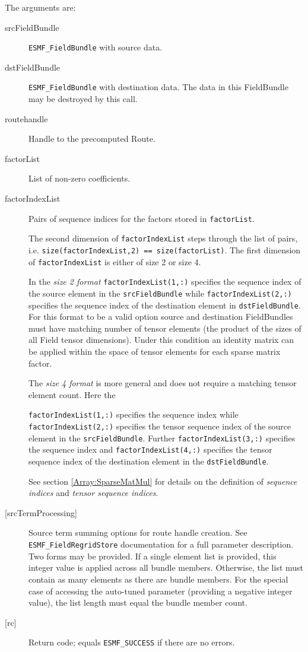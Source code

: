    The arguments are:
   \begin{description}
   \item [srcFieldBundle]
   {\tt ESMF\_FieldBundle} with source data.
   \item [dstFieldBundle]
   {\tt ESMF\_FieldBundle} with destination data. The data in this
   FieldBundle may be destroyed by this call.
   \item [routehandle]
   Handle to the precomputed Route.
   \item [factorList]
   List of non-zero coefficients.
   \item [factorIndexList]
   Pairs of sequence indices for the factors stored in {\tt factorList}.
  
   \begin{sloppypar}
   The second dimension of {\tt factorIndexList} steps through the list of
   pairs, i.e. {\tt size(factorIndexList,2) == size(factorList)}. The first
   dimension of {\tt factorIndexList} is either of size 2 or size 4.
   \end{sloppypar}
  
   In the {\em size 2 format} {\tt factorIndexList(1,:)} specifies the
   sequence index of the source element in the {\tt srcFieldBundle} while
   {\tt factorIndexList(2,:)} specifies the sequence index of the
   destination element in {\tt dstFieldBundle}. For this format to be a valid
   option source and destination FieldBundles must have matching number of
   tensor elements (the product of the sizes of all Field tensor dimensions).
   Under this condition an identity matrix can be applied within the space of
   tensor elements for each sparse matrix factor.
  
   The {\em size 4 format} is more general and does not require a matching
   tensor element count. Here the
  
   {\tt factorIndexList(1,:)} specifies the
   sequence index while {\tt factorIndexList(2,:)} specifies the tensor
   sequence index of the source element in the {\tt srcFieldBundle}. Further
   {\tt factorIndexList(3,:)} specifies the sequence index and
   {\tt factorIndexList(4,:)} specifies the tensor sequence index of the
   destination element in the {\tt dstFieldBundle}.
  
   See section \ref{Array:SparseMatMul} for details on the definition of
   {\em sequence indices} and {\em tensor sequence indices}.
   \item [{[srcTermProcessing]}]
   Source term summing options for route handle creation. See
   {\tt ESMF\_FieldRegridStore} documentation for a full parameter description.
   Two forms may be provided. If a single element list is provided, this
   integer value is applied across all bundle members. Otherwise, the list must
   contain as many elements as there are bundle members. For the special case
   of accessing the auto-tuned parameter (providing a negative integer value),
   the list length must equal the bundle member count.
   \item [{[rc]}]
   Return code; equals {\tt ESMF\_SUCCESS} if there are no errors.
   \end{description}
   
